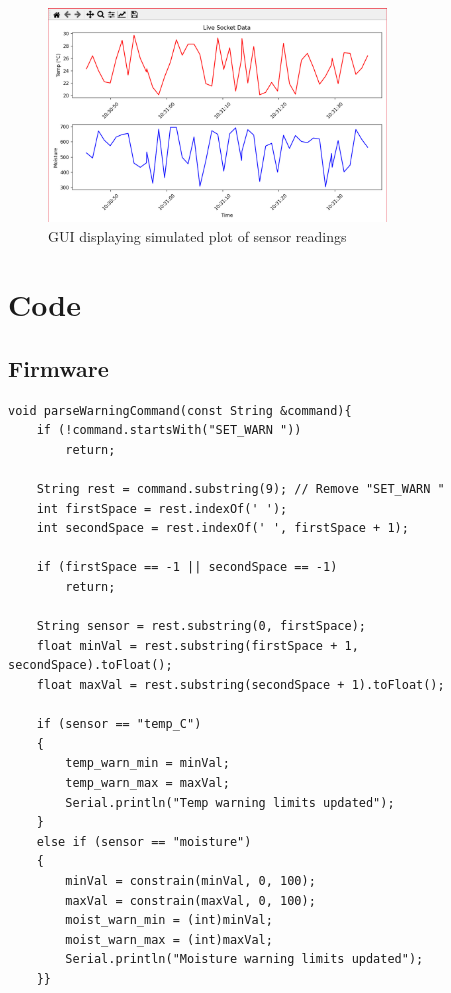 \documentclass[a4paper,11pt]{article}
\begin{document}
\begin{figure}[H]
    \centering
    \includegraphics[width=0.8\textwidth]{Dummy Plotting.png}
    \caption{GUI displaying simulated plot of sensor readings}
    \label{fig:prelim_GUI_plot}
\end{figure}

\section{Code}
\subsection{Firmware}

\begin{lstlisting}[style=cpp-style, 
caption={\textit{parseWarningCommand} function, 
emblematic of similar functions in \texttt{main.ino}}, label={prog:warn}]
void parseWarningCommand(const String &command){
    if (!command.startsWith("SET_WARN "))
        return;

    String rest = command.substring(9); // Remove "SET_WARN "
    int firstSpace = rest.indexOf(' ');
    int secondSpace = rest.indexOf(' ', firstSpace + 1);

    if (firstSpace == -1 || secondSpace == -1)
        return;

    String sensor = rest.substring(0, firstSpace);
    float minVal = rest.substring(firstSpace + 1, secondSpace).toFloat();
    float maxVal = rest.substring(secondSpace + 1).toFloat();

    if (sensor == "temp_C")
    {
        temp_warn_min = minVal;
        temp_warn_max = maxVal;
        Serial.println("Temp warning limits updated");
    }
    else if (sensor == "moisture")
    {
        minVal = constrain(minVal, 0, 100);
        maxVal = constrain(maxVal, 0, 100);
        moist_warn_min = (int)minVal;
        moist_warn_max = (int)maxVal;
        Serial.println("Moisture warning limits updated");
    }}
\end{lstlisting}
\end{document}
